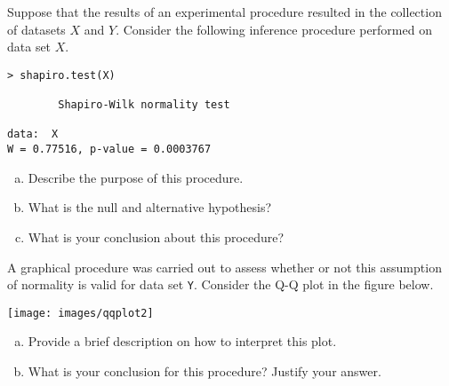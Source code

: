 \documentclass[a4paper,12pt]{article}
\begin{document}

\item Suppose that the results of an experimental procedure resulted in the collection of datasets $X$ and $Y$. Consider the following inference procedure performed on data set $X$.
\begin{center}
\begin{framed}
\begin{verbatim}
> shapiro.test(X)

        Shapiro-Wilk normality test

data:  X
W = 0.77516, p-value = 0.0003767
\end{verbatim}
\end{framed}
\end{center}


\begin{enumerate}[(a)]
	\item Describe the purpose of this procedure.
	\item What is the null and alternative hypothesis?
	\item What is your conclusion about this procedure?
\end{enumerate}
\newpage
\item A graphical procedure was carried out to assess whether or not this assumption of normality is valid for data set \texttt{Y}. Consider the Q-Q plot in the figure below.

\begin{center}
	\texttt{[image: images/qqplot2]}
\end{center}

\begin{enumerate}[(a)]
	\item Provide a brief description on how to interpret this plot.
	\item  What is your conclusion for this procedure? Justify your answer.
\end{enumerate}
\end{document}
